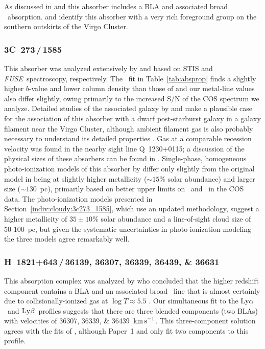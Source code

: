 \documentclass[twocolumn,twocolappendix,tighten,times]{aastex6}
\newcommand{\HI}{\ion{H}{1}}
\newcommand{\CIV}{\ion{C}{4}}
\newcommand{\OVI}{\ion{O}{6}}
\newcommand{\SiIV}{\ion{Si}{4}}
\newcommand{\fuse}{{\sl FUSE}}
\newcommand{\kms}{\ensuremath{{\rm km\,s}^{-1}}}
\newcommand{\lya}{\ensuremath{{\rm Ly}\alpha}}
\newcommand{\lyb}{\ensuremath{{\rm Ly}\beta}}
\begin{document}
As discussed in \citet{savage14} and \citet{stocke14} this absorber includes a
BLA and associated broad \OVI\ absorption. \citet{stocke14} and \citet{yoon12} 
identify this absorber with a very rich foreground group on the southern
outskirts of the Virgo Cluster.


\subsubsection{3C~273\,/\,1585}
\label{indiv:absorbers:3c273_1585}

This absorber was analyzed extensively by \citet{tripp02} and
\citet{sembach01} based on STIS and \fuse\ spectroscopy, respectively.
The \HI\ fit in Table~\ref{tab:absprop} finds a slightly higher
$b$-value and  lower column density than those of \citet{sembach01}
and our metal-line  values also differ slightly, owing primarily to
the increased S/N of the COS spectrum we analyze.  Detailed studies of
the associated galaxy by \citet{stocke04} and \citet {keeney14} make a plausible
case for the association of this absorber with a dwarf post-starburst
galaxy in a galaxy filament near the Virgo Cluster, although ambient
filament gas is also probably necessary to understand its detailed
properties \citep{keeney14}. Gas at a comparable recession velocity
was found in the nearby sight line Q~1230+0115; a discussion of the
physical sizes of these absorbers can be found in
\citet{rosenberg03}. Single-phase, homogeneous photo-ionization models
of this absorber by \citet{keeney14} differ only slightly from the
original \citet{tripp02} model in being at slightly higher metallicity
($\sim15$\% solar abundance) and larger size ($\sim130$~pc), primarily
based on better upper limits on \SiIV\ and \CIV\ in the COS data. The
photo-ionization models presented in Section~\ref{indiv:cloudy:3c273_1585},
which use an  updated methodology, suggest a higher metallicity of
$35\pm10$\% solar abundance  and a line-of-sight cloud size of
50-100~pc, but given the systematic  uncertainties in photo-ionization
modeling the three models agree remarkably well.


\subsubsection{H~1821+643\,/\,36139, 36307, 36339, 36439, \& 36631}
\label{indiv:absorbers:h1821_36339}

This absorption complex was analyzed by \citet{tripp01} who concluded
that the higher redshift component contains a BLA and an associated
broad  \OVI\ line that is almost certainly due to
collisionally-ionized gas at  $\log{T}\approx5.5$ 
\citep[see also][]{savage14}. Our simultaneous  fit to the \lya\ and \lyb\
profiles suggests that there are three blended  components (two BLAs)
with velocities of 36307, 36339, \& 36439~\kms. This three-component 
solution agrees with the fits of \citet{danforth16}, although Paper~1 and 
\citet{savage14} only fit two components to this profile.
\end{document}
